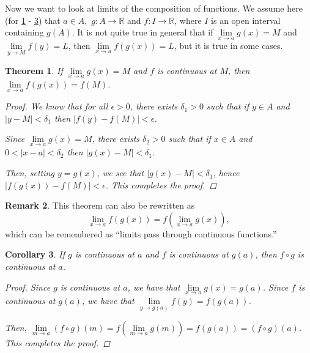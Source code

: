 \documentclass[11pt]{article}
\newcommand{\bbR}{\mathbb{R}}
\renewcommand{\_}[1]{\underline{ #1 }}
\newtheorem{theorem}{Theorem}[section]
\newtheorem{corollary}[theorem]{Corollary}
\theoremstyle{definition}
\newtheorem{remark}[theorem]{Remark}
\numberwithin{equation}{subsection}
\begin{document}
Now we want to look at limits of the composition of functions. We assume here (for \ref{comp1} - \ref{comp3}) that  $a\in A,$ $g\colon A\to \bbR$ and $f\colon I\to \bbR$, where $I$ is an open interval containing $\overline{g(A)}.$  
It is not quite true in general that if
$\lim\limits_{x\to a} g(x) = M$ and $\lim\limits_{y\to M} f(y) = L$,
then $\lim\limits_{x\to a} f(g(x)) = L$, but it is true in some cases. 
\begin{theorem} \label{comp1}
	If $\lim\limits_{x\to a} g(x) = M$ and $f$ is continuous at $M$, then
	$\lim\limits_{x\to a} f(g(x)) = f(M)$. 
        
\begin{proof}
We know that for all $\epsilon>0$, there exists $\delta_1>0$ such that if $y \in A$ and $|y-M|<\delta_1$ then $|f(y)-f(M)|<\epsilon$.

Since $\lim\limits_{x\to a} g(x) = M$, there exists $\delta_2>0$ such that if $x \in A$ and $0<|x-a|<\delta_2$ then $|g(x)-M|<\delta_1$. 

Then, setting $y=g(x)$, we see that $|g(x)-M|<\delta_1$, hence $|f(g(x))-f(M)|<\epsilon$. This completes the proof.

\renewcommand\qedsymbol{QED}
\end{proof}


\end{theorem}

\begin{remark} \label{comp2}
	This theorem can also be rewritten as
	\[
		\lim\limits_{x\to a} f(g(x)) = f\left(\lim\limits_{x\to a} g(x)\right),
	\]
	which can be remembered as ``limits pass through continuous functions.''
\end{remark}

\begin{corollary}\label{comp3}
	If $g$ is continuous at $a$ and $f$ is continuous at $g(a)$, then $f\circ g$ is continuous at $a$.


\begin{proof}
Since $g$ is continuous at $a$, we have that $\lim\limits_{x\to a} g(x) = g(a)$. Since $f$ is continuous at $g(a)$, we have that $\lim\limits_{y\to g(a)} f(y) = f(g(a))$. 

Then, $\lim\limits_{m\to a} (f\circ g) (m) = f(\lim\limits_{m\to a} g(m)) = f(g(a)) = (f\circ g)(a)$. This completes the proof.  

\renewcommand\qedsymbol{QED}
\end{proof}


\end{corollary}\newpage
\end{document}
